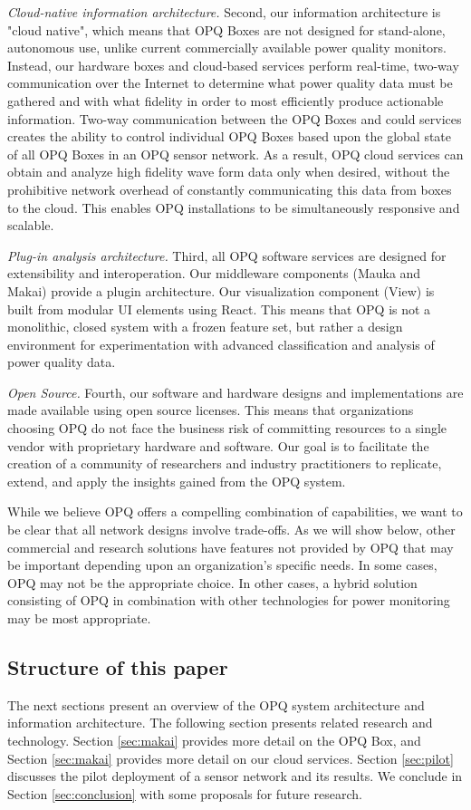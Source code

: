 {\em Cloud-native information architecture.} Second, our information architecture is "cloud native", which means that OPQ Boxes are not designed for stand-alone, autonomous use, unlike current commercially available power quality monitors. Instead, our hardware boxes and cloud-based services perform real-time, two-way communication over the Internet to determine what power quality data must be gathered and with what fidelity in order to most efficiently produce actionable information. Two-way communication between the OPQ Boxes and could services creates the ability to control individual OPQ Boxes based upon the global state of all OPQ Boxes in an OPQ sensor network. As a result, OPQ cloud services can obtain and analyze high fidelity wave form data only when desired, without the prohibitive network overhead of constantly communicating this data from boxes to the cloud. This enables OPQ installations to be simultaneously responsive and scalable.

{\em Plug-in analysis architecture.} Third, all OPQ software services are designed for extensibility and interoperation. Our middleware components (Mauka and Makai) provide a plugin architecture. Our visualization component (View) is built from modular UI elements using React.  This means that OPQ is not a monolithic, closed system with a frozen feature set, but rather a design environment for experimentation with advanced classification and analysis of power quality data.

{\em Open Source.} Fourth, our software and hardware designs and implementations are made available using open source licenses. This means that organizations choosing OPQ do not face the business risk of committing resources to a single vendor with proprietary hardware and software. Our goal is to facilitate the creation of a community of researchers and industry practitioners to replicate, extend, and apply the insights gained from the OPQ system.

While we believe OPQ offers a compelling combination of capabilities, we want to be clear that all network designs involve trade-offs. As we will show below, other commercial and research solutions have features not provided by OPQ that may be important depending upon an organization's specific needs. In some cases, OPQ may not be the appropriate choice. In other cases, a hybrid solution consisting of OPQ in combination with other technologies for power monitoring may be most appropriate.

\subsection{Structure of this paper}

The next sections present an overview of the OPQ system architecture and information architecture. The following section presents related research and technology.  Section \ref{sec:makai} provides more detail on the OPQ Box, and Section \ref{sec:makai} provides more detail on our cloud services. Section \ref{sec:pilot} discusses the pilot deployment of a sensor network and its results. We conclude in Section \ref{sec:conclusion} with some proposals for future research.



